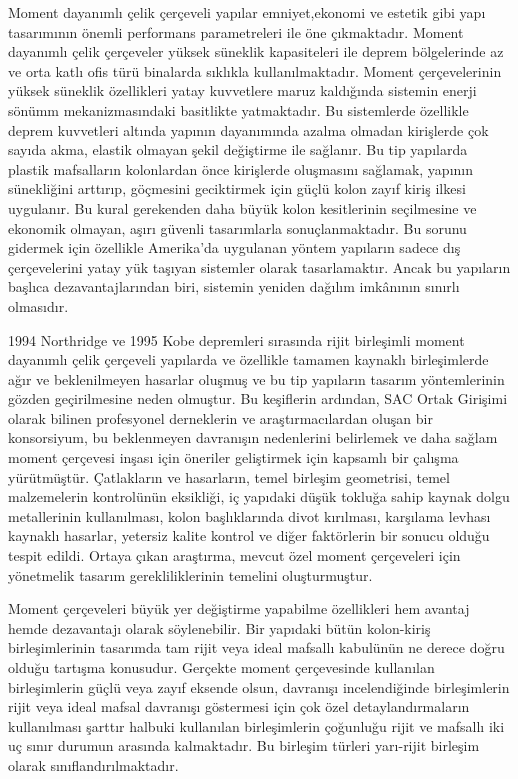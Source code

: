 Moment dayanımlı çelik çerçeveli yapılar emniyet,ekonomi ve estetik
gibi yapı tasarımının önemli performans parametreleri ile öne çıkmaktadır.
Moment dayanımlı çelik çerçeveler yüksek süneklik kapasiteleri ile
deprem bölgelerinde az ve orta katlı ofis türü binalarda sıklıkla
kullanılmaktadır. Moment çerçevelerinin yüksek süneklik özellikleri
yatay kuvvetlere maruz kaldığında sistemin enerji sönümm mekanizmasındaki
basitlikte yatmaktadır. Bu sistemlerde özellikle deprem kuvvetleri
altında yapının dayanımında azalma olmadan kirişlerde çok sayıda akma,
elastik olmayan şekil değiştirme ile sağlanır. Bu tip yapılarda plastik
mafsalların kolonlardan önce kirişlerde oluşmasını sağlamak, yapının
sünekliğini arttırıp, göçmesini geciktirmek için güçlü kolon zayıf
kiriş ilkesi uygulanır. Bu kural gerekenden daha büyük kolon kesitlerinin
seçilmesine ve ekonomik olmayan, aşırı güvenli tasarımlarla sonuçlanmaktadır.
Bu sorunu gidermek için özellikle Amerika’da uygulanan yöntem yapıların
sadece dış çerçevelerini yatay yük taşıyan sistemler olarak tasarlamaktır.
Ancak bu yapıların başlıca dezavantajlarından biri, sistemin yeniden
dağılım imkânının sınırlı olmasıdır. 

1994 Northridge ve 1995 Kobe depremleri sırasında rijit birleşimli
moment dayanımlı çelik çerçeveli yapılarda ve özellikle tamamen kaynaklı
birleşimlerde ağır ve beklenilmeyen hasarlar oluşmuş ve bu tip yapıların
tasarım yöntemlerinin gözden geçirilmesine neden olmuştur. Bu keşiflerin
ardından, SAC Ortak Girişimi olarak bilinen profesyonel derneklerin
ve araştırmacılardan oluşan bir konsorsiyum, bu beklenmeyen davranışın
nedenlerini belirlemek ve daha sağlam moment çerçevesi inşası için
öneriler geliştirmek için kapsamlı bir çalışma yürütmüştür. Çatlakların
ve hasarların, temel birleşim geometrisi, temel malzemelerin kontrolünün
eksikliği, iç yapıdaki düşük tokluğa sahip kaynak dolgu metallerinin
kullanılması, kolon başlıklarında divot kırılması, karşılama levhası
kaynaklı hasarlar, yetersiz kalite kontrol ve diğer faktörlerin bir
sonucu olduğu tespit edildi. Ortaya çıkan araştırma, mevcut özel moment
çerçeveleri için yönetmelik tasarım gerekliliklerinin temelini oluşturmuştur.

Moment çerçeveleri büyük yer değiştirme yapabilme özellikleri hem
avantaj hemde dezavantajı olarak söylenebilir. Bir yapıdaki bütün
kolon-kiriş birleşimlerinin tasarımda tam rijit veya ideal mafsallı
kabulünün ne derece doğru olduğu tartışma konusudur. Gerçekte moment
çerçevesinde kullanılan birleşimlerin güçlü veya zayıf eksende olsun,
davranışı incelendiğinde birleşimlerin rijit veya ideal mafsal davranışı
göstermesi için çok özel detaylandırmaların kullanılması şarttır halbuki
kullanılan birleşimlerin çoğunluğu rijit ve mafsallı iki uç sınır
durumun arasında kalmaktadır. Bu birleşim türleri yarı-rijit birleşim
olarak sınıflandırılmaktadır. 


